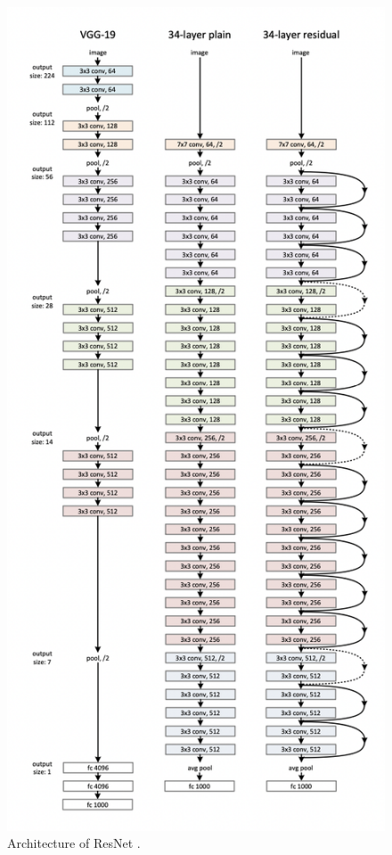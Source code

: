 \documentclass[
]{krantz}
\begin{document}
\begin{figure}

{\centering \includegraphics[width=1\linewidth]{./figures/01-chapter1/ResNet_architecture} 

}

\caption{Architecture of ResNet \citep{ResNet}.}\label{fig:ch01-figure02}
\end{figure}
\end{document}

